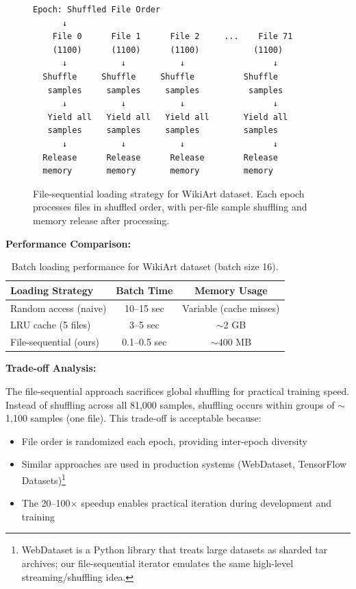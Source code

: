 \begin{figure}[htbp]
\centering
\small
\begin{verbatim}
Epoch: Shuffled File Order
      ↓
    File 0      File 1      File 2     ...    File 71
    (1100)      (1100)      (1100)           (1100)
      ↓           ↓           ↓                  ↓
  Shuffle     Shuffle     Shuffle          Shuffle
   samples     samples     samples          samples
      ↓           ↓           ↓                  ↓
   Yield all   Yield all   Yield all       Yield all
   samples     samples     samples         samples
      ↓           ↓           ↓                  ↓
  Release      Release      Release        Release
  memory       memory       memory         memory
\end{verbatim}
\caption{File-sequential loading strategy for WikiArt dataset. Each epoch processes files in shuffled order, with per-file sample shuffling and memory release after processing.}
\label{fig:wikiart-loading}
\end{figure}

\textbf{Performance Comparison:}

\begin{table}[htbp]
\centering
\begin{tabular}{lcc}
\toprule
\textbf{Loading Strategy} & \textbf{Batch Time} & \textbf{Memory Usage} \\
\midrule
Random access (naive) & 10--15 sec & Variable (cache misses) \\
LRU cache (5 files) & 3--5 sec & $\sim$2 GB \\
File-sequential (ours) & 0.1--0.5 sec & $\sim$400 MB \\
\bottomrule
\end{tabular}
\caption{Batch loading performance for WikiArt dataset (batch size 16).}
\label{tab:wikiart-loading-perf}
\end{table}

\textbf{Trade-off Analysis:}

The file-sequential approach sacrifices global shuffling for practical training speed. Instead of shuffling across all 81,000 samples, shuffling occurs within groups of $\sim$1,100 samples (one file). This trade-off is acceptable because:

\begin{itemize}
    \item File order is randomized each epoch, providing inter-epoch diversity
    \item Similar approaches are used in production systems (WebDataset, TensorFlow Datasets)\footnote{WebDataset is a Python library that treats large datasets as sharded tar archives; our file-sequential iterator emulates the same high-level streaming/shuffling idea.}
    \item The 20--100$\times$ speedup enables practical iteration during development and training
\end{itemize}

